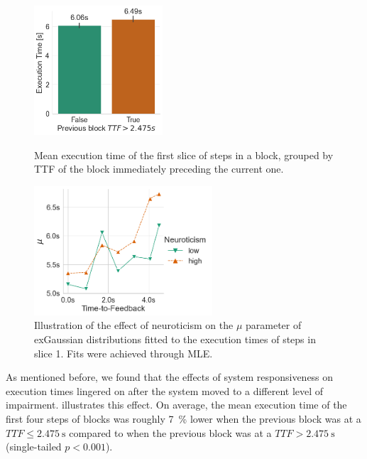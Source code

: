 \begin{figure}
    \begin{minipage}[t]{.45\textwidth}
        \centering
        \includegraphics[height=13em]{Figs/2021Impact/previousblock_vs_exectime}
        \caption{Mean execution time of the first slice of steps in a block, grouped by \acs{TTF} of the block immediately preceding the current one.}\label{fig:prevblockvsexectime}
    \end{minipage}%
    \hfill%
    \begin{minipage}[t]{.45\textwidth}
        \centering
        \includegraphics[height=13em]{publications/2023EdgeDroid2/figs/new_model/mu_fits_exgaussian_slice0}
        \caption{%
            Illustration of the effect of neuroticism on the \ensuremath{\mu} parameter of \acs{exGaussian} distributions fitted to the execution times of steps in slice \num{1}.
            Fits were achieved through \gls{MLE}.
        }\label{fig:ttfvsexgaussianmu}
    \end{minipage}
\end{figure}

As mentioned before, we found that the effects of system responsiveness on execution times lingered on after the system moved to a different level of impairment.
 illustrates this effect.
On average, the mean execution time of the first four steps of blocks was roughly \SI{7}{\percent} lower when the previous block was at a \ensuremath{TTF \leq \SI{2.475}{\second}} compared to when the previous block was at a \ensuremath{TTF > \SI{2.475}{\second}} (single-tailed \ensuremath{p < 0.001}).

